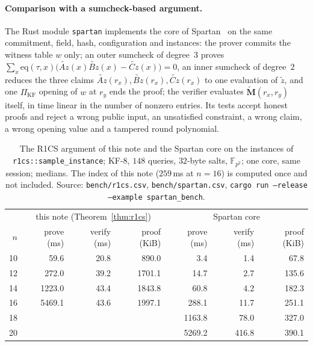 \documentclass[11pt]{article}
\theoremstyle{definition}
\newcommand{\F}{\mathbb{F}}
\begin{document}
\paragraph{Comparison with a sumcheck-based argument.}
The Rust module \texttt{spartan} implements the core of Spartan~\cite{Set20} on the same commitment, field, hash, configuration and instances: the prover commits the witness table $w$ only; an outer sumcheck of degree~$3$ proves $\sum_x\mathrm{eq}(\tau,x)\bigl(\tilde{Az}(x)\tilde{Bz}(x)-\tilde{Cz}(x)\bigr)=0$, an inner sumcheck of degree~$2$ reduces the three claims $\tilde{Az}(r_x),\tilde{Bz}(r_x),\tilde{Cz}(r_x)$ to one evaluation of $\tilde z$, and one $\Pi_{\mathrm{KF}}$ opening of $w$ at $r_y$ ends the proof; the verifier evaluates $\tilde{\mathbf M}(r_x,r_y)$ itself, in time linear in the number of nonzero entries. Its tests accept honest proofs and reject a wrong public input, an unsatisfied constraint, a wrong claim, a wrong opening value and a tampered round polynomial.

\begin{table}[h]
\centering\small
\setlength{\tabcolsep}{4pt}
\begin{tabular}{r rrr rrr}
\hline
& \multicolumn{3}{c}{this note (Theorem~\ref{thm:r1cs})} & \multicolumn{3}{c}{Spartan core}\\
$n$ & prove (ms) & verify (ms) & proof (KiB) & prove (ms) & verify (ms) & proof (KiB)\\
\hline
10 & 59.6 & 20.8 & 890.0 & 3.4 & 1.4 & 67.8\\
12 & 272.0 & 39.2 & 1701.1 & 14.7 & 2.7 & 135.6\\
14 & 1223.0 & 43.4 & 1843.8 & 60.8 & 4.2 & 182.3\\
16 & 5469.1 & 43.6 & 1997.1 & 288.1 & 11.7 & 251.1\\
18 & & & & 1163.8 & 78.0 & 327.0\\
20 & & & & 5269.2 & 416.8 & 390.1\\
\hline
\end{tabular}
\caption{The R1CS argument of this note and the Spartan core on the instances of \texttt{r1cs::sample\_instance}; KF-8, $148$ queries, $32$-byte salts, $\F_{p^2}$; one core, same session; medians. The index of this note ($259$\,ms at $n=16$) is computed once and not included. Source: \texttt{bench/r1cs.csv}, \texttt{bench/spartan.csv}, \texttt{cargo run --release --example spartan\_bench}.}
\end{table}
\end{document}
